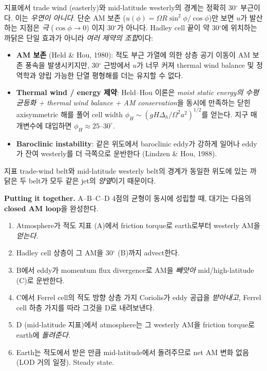 \begin{remark}
지표에서 trade wind (easterly)와 mid-latitude westerly의 경계는 정확히 30$^\circ$
부근이다.  이는 \emph{우연이 아니다}.  단순 AM 보존 ($u(\phi) = \Omega R
\sin^2\phi/\cos\phi$)만 보면 $u$가 발산하는 지점은 \emph{극} ($\cos\phi \to 0$)
이지 30$^\circ$가 아니다.  Hadley cell 끝이 약 30$^\circ$에 위치하는
까닭은 단일 효과가 아니라 \emph{여러 제약의 조합}이다:
\begin{itemize}
  \item \textbf{AM 보존} (Held \& Hou, 1980): 적도 부근 가열에 의한 상층
    공기 이동이 AM 보존 풍속을 발생시키지만, 30$^\circ$ 근방에서 $u$가 너무
    커져 thermal wind balance 및 정역학과 양립 가능한 단열 평형해를 더는
    유지할 수 없다.
  \item \textbf{Thermal wind / energy 제약}: Held--Hou 이론은
    \emph{moist static energy의 수평 균등화 + thermal wind balance + AM
    conservation}을 동시에 만족하는 닫힌 axisymmetric 해를 풀어 cell width
    $\phi_H \sim (gH\Delta_h/\Omega^2 a^2)^{1/2}$를 얻는다.  지구 매개변수에
    대입하면 $\phi_H \approx 25$--$30^\circ$.
  \item \textbf{Baroclinic instability}: 같은 위도에서 baroclinic eddy가
    강하게 일어나 eddy가 잔여 westerly를 더 극쪽으로 운반한다 (Lindzen \&
    Hou, 1988).
\end{itemize}
지표 trade-wind belt와 mid-latitude westerly belt의 경계가 동일한 위도에 있는
까닭은 두 belt가 모두 같은 jet의 \emph{양옆}이기 때문이다.
\end{remark}


\medskip



\noindent\textbf{Putting it together.}
A--B--C--D 4점의 균형이 동시에 성립할 때, 대기는 다음의 \textbf{closed AM
loop}을 완성한다.

\begin{enumerate}
  \item Atmosphere가 적도 지표 (A)에서 friction torque로 earth로부터
    westerly AM을 \emph{얻는다}.
  \item Hadley cell 상층이 그 AM을 30$^\circ$ (B)까지 advect한다.
  \item B에서 eddy가 momentum flux divergence로 AM을 \emph{빼앗아}
    mid/high-latitude (C)로 운반한다.
  \item C에서 Ferrel cell의 적도 방향 상층 가지 Coriolis가 eddy 공급을
    \emph{받아내고}, Ferrel cell 하층 가지를 따라 그것을 D로 내려보낸다.
  \item D (mid-latitude 지표)에서 atmosphere는 그 westerly AM을 friction
    torque로 earth에 \emph{돌려준다}.
  \item Earth는 적도에서 받은 만큼 mid-latitude에서 돌려주므로 net AM 변화 없음
    (LOD 거의 일정).  Steady state.
\end{enumerate}

